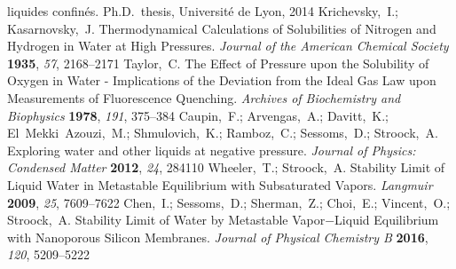 \documentclass[aps,prl,twocolumn,superscriptaddress,groupedaddress]{revtex4}
\begin{document}
\begin{mcitethebibliography}{88}
  liquides confin{\'e}s. Ph.D.\ thesis, Universit{\'e} de Lyon, 2014\relax
\mciteBstWouldAddEndPuncttrue
\mciteSetBstMidEndSepPunct{\mcitedefaultmidpunct}
{\mcitedefaultendpunct}{\mcitedefaultseppunct}\relax
\EndOfBibitem
{}
Krichevsky,~I.; Kasarnovsky,~J. Thermodynamical Calculations of Solubilities of
  Nitrogen and Hydrogen in Water at High Pressures. \emph{Journal of the
  American Chemical Society} \textbf{1935}, \emph{57}, 2168--2171\relax
\mciteBstWouldAddEndPuncttrue
\mciteSetBstMidEndSepPunct{\mcitedefaultmidpunct}
{\mcitedefaultendpunct}{\mcitedefaultseppunct}\relax
\EndOfBibitem
{}
Taylor,~C. The Effect of Pressure upon the Solubility of Oxygen in Water -
  Implications of the Deviation from the Ideal Gas Law upon Measurements of
  Fluorescence Quenching. \emph{Archives of Biochemistry and Biophysics}
  \textbf{1978}, \emph{191}, 375--384\relax
\mciteBstWouldAddEndPuncttrue
\mciteSetBstMidEndSepPunct{\mcitedefaultmidpunct}
{\mcitedefaultendpunct}{\mcitedefaultseppunct}\relax
\EndOfBibitem
{}
Caupin,~F.; Arvengas,~A.; Davitt,~K.; El~Mekki~Azouzi,~M.; Shmulovich,~K.;
  Ramboz,~C.; Sessoms,~D.; Stroock,~A. Exploring water and other liquids at
  negative pressure. \emph{Journal of Physics: Condensed Matter} \textbf{2012},
  \emph{24}, 284110\relax
\mciteBstWouldAddEndPuncttrue
\mciteSetBstMidEndSepPunct{\mcitedefaultmidpunct}
{\mcitedefaultendpunct}{\mcitedefaultseppunct}\relax
\EndOfBibitem
{}
Wheeler,~T.; Stroock,~A. Stability Limit of Liquid Water in Metastable
  Equilibrium with Subsaturated Vapors. \emph{Langmuir} \textbf{2009},
  \emph{25}, 7609--7622\relax
\mciteBstWouldAddEndPuncttrue
\mciteSetBstMidEndSepPunct{\mcitedefaultmidpunct}
{\mcitedefaultendpunct}{\mcitedefaultseppunct}\relax
\EndOfBibitem
{}
Chen,~I.; Sessoms,~D.; Sherman,~Z.; Choi,~E.; Vincent,~O.; Stroock,~A.
  Stability Limit of Water by Metastable Vapor−Liquid Equilibrium with
  Nanoporous Silicon Membranes. \emph{Journal of Physical Chemistry B}
  \textbf{2016}, \emph{120}, 5209--5222\relax
\mciteBstWouldAddEndPuncttrue
\mciteSetBstMidEndSepPunct{\mcitedefaultmidpunct}
{\mcitedefaultendpunct}{\mcitedefaultseppunct}\relax
\EndOfBibitem
{}

\end{mcitethebibliography}
\end{document}
